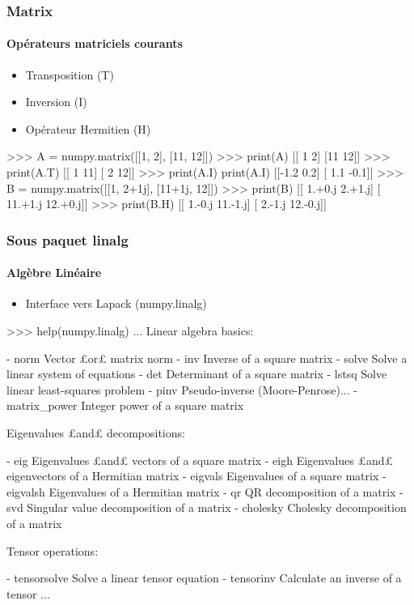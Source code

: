 \begin{frame}[fragile]
\frametitle{Matrix}
\framesubtitle{Opérateurs matriciels courants}
\begin{itemize}
 \item Transposition (T)
 \item Inversion (I)
 \item Opérateur Hermitien (H)
\end{itemize}
\begin{pythonConsole}
>>> A = numpy.matrix([[1, 2], [11, 12]])
>>> print(A)
[[ 1  2]
 [11 12]]
>>> print(A.T)
[[ 1 11]
 [ 2 12]]
>>> print(A.I)
print(A.I)
[[-1.2  0.2]
 [ 1.1 -0.1]]
>>> B = numpy.matrix([[1, 2+1j], [11+1j, 12]])
>>> print(B)
[[  1.+0.j   2.+1.j]
 [ 11.+1.j  12.+0.j]]
>>> print(B.H)
[[  1.-0.j  11.-1.j]
 [  2.-1.j  12.-0.j]]
\end{pythonConsole}
\end{frame}
\begin{frame}[fragile]
\frametitle{Sous paquet linalg}
\framesubtitle{Algèbre Linéaire}
\begin{itemize}
 \item Interface vers Lapack (numpy.linalg)
\end{itemize}
\begin{pythonConsole}
>>> help(numpy.linalg)
...
    Linear algebra basics:
    
    - norm            Vector £or£ matrix norm
    - inv             Inverse of a square matrix
    - solve           Solve a linear system of equations
    - det             Determinant of a square matrix
    - lstsq           Solve linear least-squares problem
    - pinv            Pseudo-inverse (Moore-Penrose)...
    - matrix_power    Integer power of a square matrix
    
    Eigenvalues £and£ decompositions:
    
    - eig             Eigenvalues £and£ vectors of a square matrix
    - eigh            Eigenvalues £and£ eigenvectors of a Hermitian matrix
    - eigvals         Eigenvalues of a square matrix
    - eigvalsh        Eigenvalues of a Hermitian matrix
    - qr              QR decomposition of a matrix
    - svd             Singular value decomposition of a matrix
    - cholesky        Cholesky decomposition of a matrix
    
    Tensor operations:
    
    - tensorsolve     Solve a linear tensor equation
    - tensorinv       Calculate an inverse of a tensor
...
\end{pythonConsole}
\end{frame}
